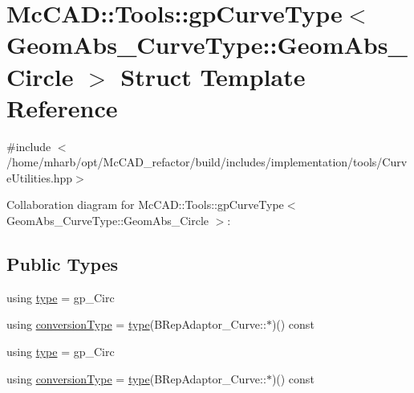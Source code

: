 \hypertarget{structMcCAD_1_1Tools_1_1gpCurveType_3_01GeomAbs__CurveType_1_1GeomAbs__Circle_01_4}{}\section{Mc\+C\+AD\+:\+:Tools\+:\+:gp\+Curve\+Type$<$ Geom\+Abs\+\_\+\+Curve\+Type\+:\+:Geom\+Abs\+\_\+\+Circle $>$ Struct Template Reference}
\label{structMcCAD_1_1Tools_1_1gpCurveType_3_01GeomAbs__CurveType_1_1GeomAbs__Circle_01_4}


{\ttfamily \#include $<$/home/mharb/opt/\+Mc\+C\+A\+D\+\_\+refactor/build/includes/implementation/tools/\+Curve\+Utilities.\+hpp$>$}



Collaboration diagram for Mc\+C\+AD\+:\+:Tools\+:\+:gp\+Curve\+Type$<$ Geom\+Abs\+\_\+\+Curve\+Type\+:\+:Geom\+Abs\+\_\+\+Circle $>$\+:
\subsection*{Public Types}
\begin{DoxyCompactItemize}
\item 
using \hyperlink{structMcCAD_1_1Tools_1_1gpCurveType_3_01GeomAbs__CurveType_1_1GeomAbs__Circle_01_4_a689453a3ee8373b37e8d9e6d187827a9}{type} = gp\+\_\+\+Circ
\item 
using \hyperlink{structMcCAD_1_1Tools_1_1gpCurveType_3_01GeomAbs__CurveType_1_1GeomAbs__Circle_01_4_abd4d90aadd68dfb0068c25797413063d}{conversion\+Type} = \hyperlink{structMcCAD_1_1Tools_1_1gpCurveType_3_01GeomAbs__CurveType_1_1GeomAbs__Circle_01_4_a689453a3ee8373b37e8d9e6d187827a9}{type}(B\+Rep\+Adaptor\+\_\+\+Curve\+::$\ast$)() const
\item 
using \hyperlink{structMcCAD_1_1Tools_1_1gpCurveType_3_01GeomAbs__CurveType_1_1GeomAbs__Circle_01_4_a689453a3ee8373b37e8d9e6d187827a9}{type} = gp\+\_\+\+Circ
\item 
using \hyperlink{structMcCAD_1_1Tools_1_1gpCurveType_3_01GeomAbs__CurveType_1_1GeomAbs__Circle_01_4_abd4d90aadd68dfb0068c25797413063d}{conversion\+Type} = \hyperlink{structMcCAD_1_1Tools_1_1gpCurveType_3_01GeomAbs__CurveType_1_1GeomAbs__Circle_01_4_a689453a3ee8373b37e8d9e6d187827a9}{type}(B\+Rep\+Adaptor\+\_\+\+Curve\+::$\ast$)() const
\end{DoxyCompactItemize}
